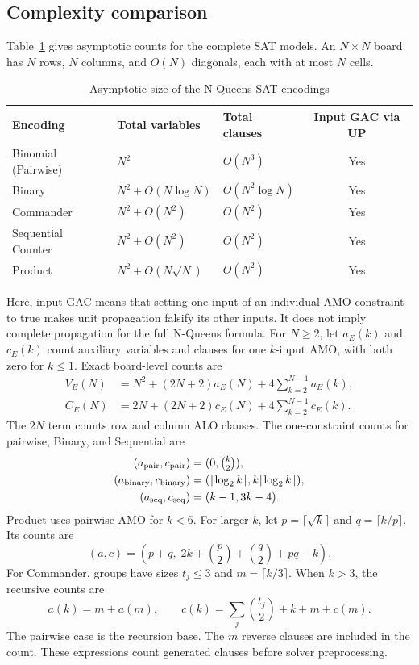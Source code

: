 \documentclass[a4paper,fleqn]{cas-sc}
\begin{document}
\subsection{Complexity comparison}
Table~\ref{tab:complexity} gives asymptotic counts for the complete SAT models. An $N\times N$ board has $N$ rows, $N$ columns, and $O(N)$ diagonals, each with at most $N$ cells.

\begin{table}
\centering
\caption{Asymptotic size of the N-Queens SAT encodings}
\label{tab:complexity}
\begin{tabular}{@{}lllc@{}}
\toprule
Encoding & Total variables & Total clauses & Input GAC via UP \\ \midrule
Binomial (Pairwise) & $N^2$ & $O(N^3)$ & Yes \\
Binary & $N^2 + O(N \log N)$ & $O(N^2 \log N)$ & Yes \\
Commander & $N^2 + O(N^2)$ & $O(N^2)$ & Yes \\
Sequential Counter & $N^2 + O(N^2)$ & $O(N^2)$ & Yes \\
Product & $N^2 + O(N\sqrt{N})$ & $O(N^2)$ & Yes \\ \bottomrule
\end{tabular}
\end{table}
Here, input GAC means that setting one input of an individual AMO constraint to true makes unit propagation falsify its other inputs. It does not imply complete propagation for the full N-Queens formula. For $N\geq2$, let $a_E(k)$ and $c_E(k)$ count auxiliary variables and clauses for one $k$-input AMO, with both zero for $k\leq1$. Exact board-level counts are
\begin{align}
V_E(N)&=N^2+(2N+2)a_E(N)+4\sum_{k=2}^{N-1}a_E(k),\\
C_E(N)&=2N+(2N+2)c_E(N)+4\sum_{k=2}^{N-1}c_E(k).
\end{align}
The $2N$ term counts row and column ALO clauses. The one-constraint counts for pairwise, Binary, and Sequential are
\begin{align}
(a_{\mathrm{pair}},c_{\mathrm{pair}})&=(0,\tbinom{k}{2}),\\
(a_{\mathrm{binary}},c_{\mathrm{binary}})&=(\lceil\log_2 k\rceil,k\lceil\log_2 k\rceil),\\
(a_{\mathrm{seq}},c_{\mathrm{seq}})&=(k-1,3k-4).
\end{align}
Product uses pairwise AMO for $k<6$. For larger $k$, let $p=\lceil\sqrt{k}\rceil$ and $q=\lceil k/p\rceil$. Its counts are
\begin{equation}
(a,c)=\left(p+q,\;2k+\binom p2+\binom q2+pq-k\right).
\end{equation}
For Commander, groups have sizes $t_j\leq3$ and $m=\lceil k/3\rceil$. When $k>3$, the recursive counts are
\begin{equation}
a(k)=m+a(m),\qquad c(k)=\sum_j\binom{t_j}{2}+k+m+c(m).
\end{equation}
The pairwise case is the recursion base. The $m$ reverse clauses are included in the count. These expressions count generated clauses before solver preprocessing.
\end{document}
